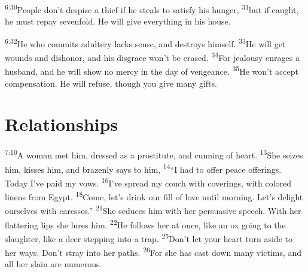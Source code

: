 \documentclass[openany,12pt,english]{book}
\newenvironment{para}{\par\pretolerance=100\tolerance=200\setlength{\emergencystretch}{0.6em}\relax}{\par}
\begin{document}
\begin{para}
    \textsuperscript{6:30}\thinspace{}Peo\-ple don't des\-pise a thief if he steals to sat\-is\-fy his hun\-ger,
    \textsuperscript{31}\thinspace{}but if caught, he must re\-pay sev\-en\-fold. He will give eve\-ry\-thing in his house.
\end{para}

\begin{para}
    \textsuperscript{6:32}\thinspace{}He who commits a\-dul\-ter\-y lacks sense, and destroys him\-self.
    \textsuperscript{33}\thinspace{}He will get wounds and dis\-hon\-or, and his dis\-grace won't be e\-rased.
    \textsuperscript{34}\thinspace{}For jeal\-ous\-y enrages a hus\-band, and he will show no mer\-cy in the day of venge\-ance.
    \textsuperscript{35}\thinspace{}He won't ac\-cept com\-pen\-sa\-tion. He will ref\-use, though you give man\-y gifts.
\end{para}

\begin{para}
\end{para}

\section*{Relationships}
\begin{para}
    \textsuperscript{7:10}\thinspace{}A wom\-an met him, dressed as a pros\-ti\-tute, and cun\-ning of heart.
    \textsuperscript{13}\thinspace{}She seizes him, kisses him, and bra\-zen\-ly says to him,
    \textsuperscript{14}\thinspace{}“I had to of\-fer peace offerings. To\-day I've paid my vows.
    \textsuperscript{16}\thinspace{}I've spread my couch with coverings, with col\-ored linens from Egypt.
    \textsuperscript{18}\thinspace{}Come, let's drink our fill of love un\-til morn\-ing. Let's de\-light our\-selves with caresses.”
    \textsuperscript{21}\thinspace{}She seduces him with her per\-sua\-sive speech. With her flattering lips she lures him.
    \textsuperscript{22}\thinspace{}He follows her at once, like an ox go\-ing to the slaugh\-ter, like a deer step\-ping in\-to a trap.
    \textsuperscript{25}\thinspace{}Don't let your heart turn a\-side to her ways. Don't stray in\-to her paths.
    \textsuperscript{26}\thinspace{}For she has cast down man\-y victims, and all her slain are nu\-mer\-ous.
\end{para}
\end{document}
